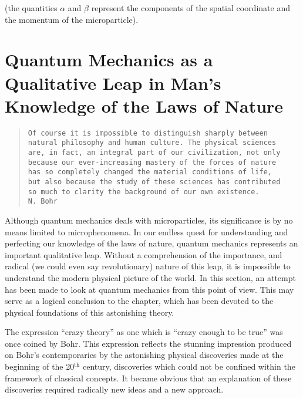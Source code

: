 \documentclass[a4paper,sfsidenotes,colorlinks=true]{tufte-book}
\numberwithin{equation}{section}
\numberwithin{figure}{section}
\begin{document}
(the quantities $\alpha$ and $\beta$ represent the components of the spatial
coordinate and the momentum of the microparticle).




\section{Quantum Mechanics as a Qualitative Leap in Man's Knowledge of
  the Laws of Nature}
\label{sec-16}
\vspace*{10pt}
\begin{fullwidth}
\begin{verse}
  \texttt{\small Of course it is impossible to distinguish sharply
    between \\
    natural philosophy and human culture. The physical sciences \\
    are, in fact, an integral part of our civilization, not only \\
    because  our ever-increasing mastery of the forces of nature \\
    has so completely changed the material conditions of life, \\
    but also because the study of these sciences has contributed \\
    so much to clarity the background of our own existence.}\\[8pt]

\texttt{\small \hspace{11cm}N. Bohr}

\end{verse}
\end{fullwidth}

Although quantum mechanics deals with microparticles, its significance is by no means limited to microphenomena. In our endless quest for understanding and perfecting our knowledge of the laws of nature, quantum mechanics represents an important qualitative leap. Without a comprehension of the importance, and radical (we could even say revolutionary) nature of this leap, it is impossible to understand the modern physical picture of the world. In this section, an attempt has been made to look at quantum mechanics from this point of view. This may serve as a logical conclusion to the chapter, which has been devoted to the physical foundations of this astonishing theory.


The expression ``crazy theory'' as one
which is ``crazy enough to be true'' was once coined by Bohr. This
expression reflects the stunning impression produced on Bohr's
contemporaries by the astonishing physical discoveries made at the
beginning of the 20$^{\mathrm{th}}$ century, discoveries which could not be
confined within the framework of classical concepts. It became
obvious that an explanation of these discoveries required radically
new ideas and a new approach.
\end{document}
